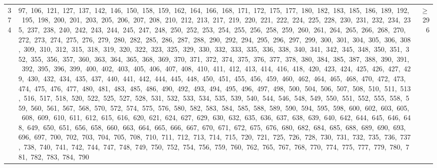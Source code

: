 \begin{longtable}{c|p{}|r}
374 & 97,\ 106,\ 121,\ 127,\ 137,\ 142,\ 146,\ 150,\ 158,\ 159,\ 162,\ 164,\ 166,\ 168,\ 171,\ 172,\ 175,\ 177,\ 180,\ 182,\ 183,\ 185,\ 186,\ 189,\ 192,\ 195,\ 198,\ 200,\ 201,\ 203,\ 205,\ 206,\ 207,\ 208,\ 210,\ 212,\ 213,\ 217,\ 219,\ 220,\ 221,\ 222,\ 224,\ 225,\ 228,\ 230,\ 231,\ 232,\ 234,\ 235,\ 237,\ 238,\ 240,\ 242,\ 243,\ 244,\ 245,\ 247,\ 248,\ 250,\ 252,\ 253,\ 254,\ 255,\ 256,\ 258,\ 259,\ 260,\ 261,\ 264,\ 265,\ 266,\ 268,\ 270,\ 272,\ 273,\ 274,\ 275,\ 276,\ 279,\ 280,\ 282,\ 285,\ 286,\ 287,\ 288,\ 290,\ 292,\ 294,\ 295,\ 296,\ 297,\ 299,\ 300,\ 301,\ 304,\ 305,\ 306,\ 308,\ 309,\ 310,\ 312,\ 315,\ 318,\ 319,\ 320,\ 322,\ 323,\ 325,\ 329,\ 330,\ 332,\ 333,\ 335,\ 336,\ 338,\ 340,\ 341,\ 342,\ 345,\ 348,\ 350,\ 351,\ 352,\ 355,\ 356,\ 357,\ 360,\ 363,\ 364,\ 365,\ 368,\ 369,\ 370,\ 371,\ 372,\ 374,\ 375,\ 376,\ 377,\ 378,\ 380,\ 384,\ 385,\ 387,\ 388,\ 390,\ 391,\ 392,\ 395,\ 396,\ 399,\ 400,\ 402,\ 403,\ 405,\ 406,\ 407,\ 408,\ 410,\ 411,\ 412,\ 413,\ 414,\ 416,\ 418,\ 420,\ 423,\ 424,\ 425,\ 426,\ 427,\ 429,\ 430,\ 432,\ 434,\ 435,\ 437,\ 440,\ 441,\ 442,\ 444,\ 445,\ 448,\ 450,\ 451,\ 455,\ 456,\ 459,\ 460,\ 462,\ 464,\ 465,\ 468,\ 470,\ 472,\ 473,\ 474,\ 475,\ 476,\ 477,\ 480,\ 481,\ 483,\ 485,\ 486,\ 490,\ 492,\ 493,\ 494,\ 495,\ 496,\ 497,\ 498,\ 500,\ 504,\ 506,\ 507,\ 508,\ 510,\ 511,\ 513,\ 516,\ 517,\ 518,\ 520,\ 522,\ 525,\ 527,\ 528,\ 531,\ 532,\ 533,\ 534,\ 535,\ 539,\ 540,\ 544,\ 546,\ 548,\ 549,\ 550,\ 551,\ 552,\ 555,\ 558,\ 559,\ 560,\ 561,\ 567,\ 568,\ 570,\ 572,\ 574,\ 575,\ 576,\ 580,\ 582,\ 583,\ 584,\ 585,\ 588,\ 589,\ 590,\ 594,\ 595,\ 598,\ 600,\ 602,\ 603,\ 605,\ 608,\ 609,\ 610,\ 611,\ 612,\ 615,\ 616,\ 620,\ 621,\ 624,\ 627,\ 629,\ 630,\ 632,\ 635,\ 636,\ 637,\ 638,\ 639,\ 640,\ 642,\ 644,\ 645,\ 646,\ 648,\ 649,\ 650,\ 651,\ 656,\ 658,\ 660,\ 663,\ 664,\ 665,\ 666,\ 667,\ 670,\ 671,\ 672,\ 675,\ 676,\ 680,\ 682,\ 684,\ 685,\ 688,\ 689,\ 690,\ 693,\ 696,\ 697,\ 700,\ 702,\ 703,\ 704,\ 705,\ 708,\ 710,\ 711,\ 712,\ 713,\ 714,\ 715,\ 720,\ 721,\ 725,\ 726,\ 728,\ 730,\ 731,\ 732,\ 735,\ 736,\ 737,\ 738,\ 740,\ 741,\ 742,\ 744,\ 747,\ 748,\ 749,\ 750,\ 752,\ 754,\ 756,\ 759,\ 760,\ 762,\ 765,\ 767,\ 768,\ 770,\ 774,\ 775,\ 777,\ 779,\ 780,\ 781,\ 782,\ 783,\ 784,\ 790 & $\ge$ 296 \\

\end{longtable}
